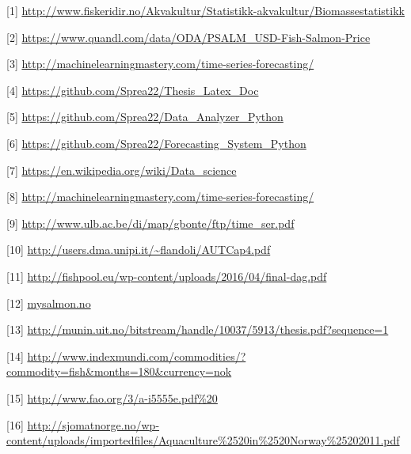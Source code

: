 
[1] \url{http://www.fiskeridir.no/Akvakultur/Statistikk-akvakultur/Biomassestatistikk}


[2] \url{https://www.quandl.com/data/ODA/PSALM_USD-Fish-Salmon-Price}


[3] \url{http://machinelearningmastery.com/time-series-forecasting/}


[4] \url{https://github.com/Sprea22/Thesis_Latex_Doc}


[5] \url{https://github.com/Sprea22/Data_Analyzer_Python}


[6] \url{https://github.com/Sprea22/Forecasting_System_Python}

[7] \url{https://en.wikipedia.org/wiki/Data_science}

[8] \url{http://machinelearningmastery.com/time-series-forecasting/}

[9] \url{http://www.ulb.ac.be/di/map/gbonte/ftp/time_ser.pdf}

[10] \url{http://users.dma.unipi.it/~flandoli/AUTCap4.pdf}

[11] \url{http://fishpool.eu/wp-content/uploads/2016/04/final-dag.pdf}

[12] \url{mysalmon.no}

[13] \url{http://munin.uit.no/bitstream/handle/10037/5913/thesis.pdf?sequence=1}

[14] \url{http://www.indexmundi.com/commodities/?commodity=fish&months=180&currency=nok}

[15] \url{http://www.fao.org/3/a-i5555e.pdf%20}

[16] \url{http://sjomatnorge.no/wp-content/uploads/importedfiles/Aquaculture%2520in%2520Norway%25202011.pdf}
